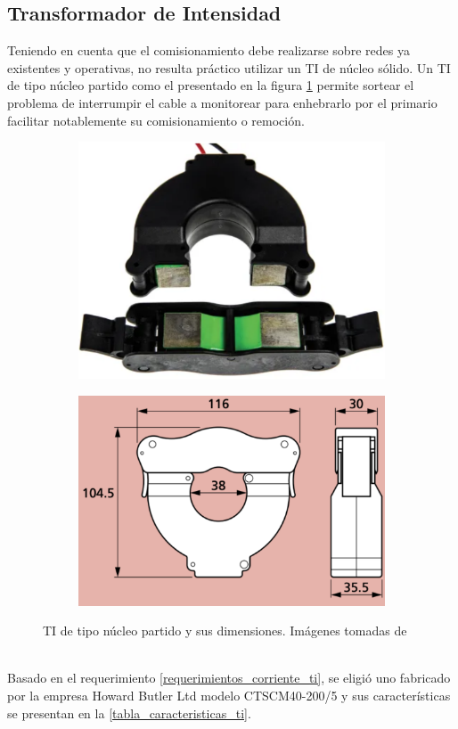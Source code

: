 \subsection{Transformador de Intensidad}
Teniendo en cuenta que el comisionamiento debe realizarse sobre redes ya existentes y operativas, no resulta práctico utilizar un TI de núcleo sólido. Un TI de tipo núcleo partido como el presentado en la figura \ref{fig:ti_abierto} permite sortear el problema de interrumpir el cable a monitorear para enhebrarlo por el primario facilitar notablemente su comisionamiento o remoción.\\
\begin{figure}[h!]
	\centering
	\begin{subfigure}[b]{0.4\textwidth}
		\centering
		\includegraphics[width=.7\textwidth]{./Figures/ti_abierto}
		\caption{}
		\label{fig:ti_abierto}
	\end{subfigure}
	\centering
	\begin{subfigure}[b]{0.4\textwidth}
		\centering
		\includegraphics[width=.7\textwidth]{./Figures/ti_dimensiones}
		\caption{}
		\label{fig:ti_dimensiones}
	\end{subfigure}
	\caption{TI de tipo núcleo partido y sus dimensiones. Imágenes tomadas de \citep{ct_hobut}}
	\label{fig:ti_mosaico}
\end{figure}\\
Basado en el requerimiento \ref{requerimientos_corriente_ti}, se eligió uno fabricado por la empresa Howard Butler Ltd modelo CTSCM40-200/5 y sus características se presentan en la \ref{tabla_caracteristicas_ti}.\\ 

